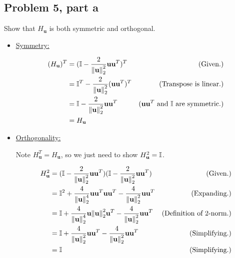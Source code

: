 \subsection{Problem 5, part a}
Show that $H_\textbf{u}$ is both symmetric and orthogonal.
\partbreak
\begin{solution}

    \begin{itemize}
        \item \underline{Symmetry:}

        \begin{align*}
            (H_\textbf{u})^T &= (\mathbb{I} - \frac{2}{\norm{\textbf{u}}_2^2}\textbf{u}\textbf{u}^T)^T &\text{(Given.)}\\
            &= \mathbb{I}^T - \frac{2}{\norm{\textbf{u}}_2^2}(\textbf{u}\textbf{u}^T)^T &\text{(Transpose is linear.)}\\
            &= \mathbb{I} - \frac{2}{\norm{\textbf{u}}_2^2}\textbf{u}\textbf{u}^T &\text{($\textbf{u}\textbf{u}^T$ and $\mathbb{I}$ are symmetric.)}\\
            &= H_\textbf{u}
        \end{align*}

        \item \underline{Orthogonality:}
        
            Note $H_\textbf{u}^T = H_\textbf{u}$, so we just need to show $H_\textbf{u}^2 = \mathbb{I}$.

            \begin{align*}
                H_\textbf{u}^2 &= (\mathbb{I} - \frac{2}{\norm{\textbf{u}}_2^2}\textbf{u}\textbf{u}^T)(\mathbb{I} - \frac{2}{\norm{\textbf{u}}_2^2}\textbf{u}\textbf{u}^T) &\text{(Given.)}\\
                &= \mathbb{I}^2 +\frac{4}{\norm{\textbf{u}}_2^4}\textbf{u}\textbf{u}^T\textbf{u}\textbf{u}^T - \frac{4}{\norm{\textbf{u}}_2^2}\textbf{u}\textbf{u}^T &\text{(Expanding.)}\\
                &= \mathbb{I} +\frac{4}{\norm{\textbf{u}}_2^4}\textbf{u}\norm{\textbf{u}}_2^2\textbf{u}^T - \frac{4}{\norm{\textbf{u}}_2^2}\textbf{u}\textbf{u}^T &\text{(Definition of 2-norm.)}\\
                &= \mathbb{I} +\frac{4}{\norm{\textbf{u}}_2^2}\textbf{u}\textbf{u}^T - \frac{4}{\norm{\textbf{u}}_2^2}\textbf{u}\textbf{u}^T &\text{(Simplifying.)}\\
                &= \mathbb{I} &\text{(Simplifying.)}
            \end{align*}
    \end{itemize}
\end{solution}

